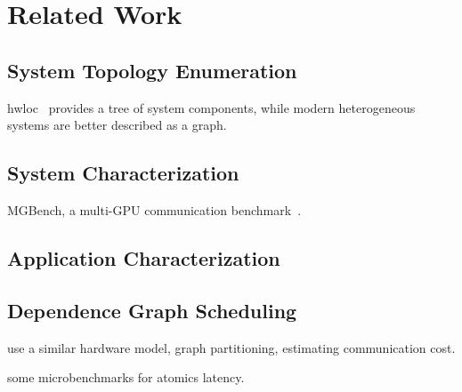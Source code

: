 \chapter{Related Work}

\section{System Topology Enumeration}

hwloc~\cite{broquedis2010hwloc} provides a tree of system components, while modern heterogeneous systems are better described as a graph.


\section{System Characterization}

MGBench, a multi-GPU communication benchmark~\cite{bennun2016mgbench}.

\section{Application Characterization}


\section{Dependence Graph Scheduling}

\cite{amaral2017topology} use a similar hardware model, graph partitioning, estimating communication cost.

\cite{gomez2013performance} some microbenchmarks for atomics latency.